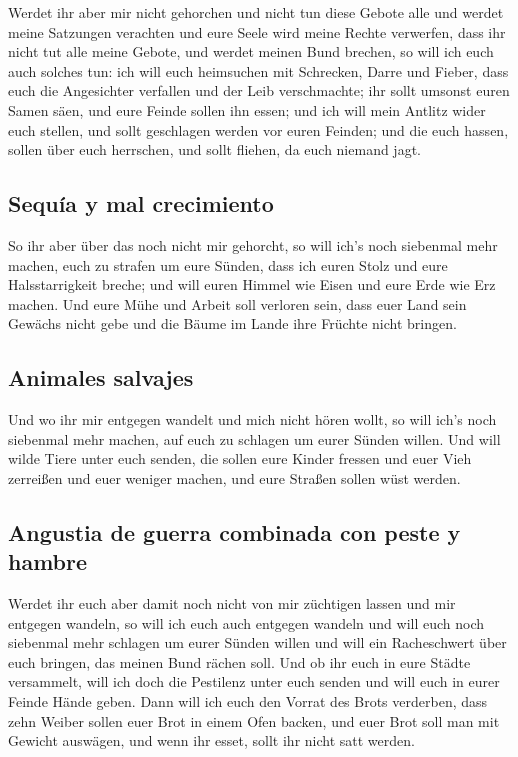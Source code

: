  Werdet ihr aber mir nicht gehorchen und nicht tun diese
Gebote alle  und werdet meine Satzungen verachten und
eure Seele wird meine Rechte verwerfen, dass ihr nicht tut alle meine
Gebote, und werdet meinen Bund brechen,  so will ich euch
auch solches tun: ich will euch heimsuchen mit Schrecken, Darre und
Fieber, dass euch die Angesichter verfallen und der Leib verschmachte;
ihr sollt umsonst euren Samen säen, und eure Feinde sollen ihn essen;
 und ich will mein Antlitz wider euch stellen, und sollt
geschlagen werden vor euren Feinden; und die euch hassen, sollen über
euch herrschen, und sollt fliehen, da euch niemand jagt.

\hypertarget{sequuxeda-y-mal-crecimiento}{%
\subsection{Sequía y mal
crecimiento}\label{sequuxeda-y-mal-crecimiento}}

 So ihr aber über das noch nicht mir gehorcht, so will
ich's noch siebenmal mehr machen, euch zu strafen um eure Sünden,
 dass ich euren Stolz und eure Halsstarrigkeit breche;
und will euren Himmel wie Eisen und eure Erde wie Erz machen.
 Und eure Mühe und Arbeit soll verloren sein, dass euer
Land sein Gewächs nicht gebe und die Bäume im Lande ihre Früchte nicht
bringen.

\hypertarget{animales-salvajes}{%
\subsection{Animales salvajes}\label{animales-salvajes}}

 Und wo ihr mir entgegen wandelt und mich nicht hören
wollt, so will ich's noch siebenmal mehr machen, auf euch zu schlagen um
eurer Sünden willen.  Und will wilde Tiere unter euch
senden, die sollen eure Kinder fressen und euer Vieh zerreißen und euer
weniger machen, und eure Straßen sollen wüst werden.

\hypertarget{angustia-de-guerra-combinada-con-peste-y-hambre}{%
\subsection{Angustia de guerra combinada con peste y
hambre}\label{angustia-de-guerra-combinada-con-peste-y-hambre}}

 Werdet ihr euch aber damit noch nicht von mir züchtigen
lassen und mir entgegen wandeln,  so will ich euch auch
entgegen wandeln und will euch noch siebenmal mehr schlagen um eurer
Sünden willen  und will ein Racheschwert über euch
bringen, das meinen Bund rächen soll. Und ob ihr euch in eure Städte
versammelt, will ich doch die Pestilenz unter euch senden und will euch
in eurer Feinde Hände geben.  Dann will ich euch den
Vorrat des Brots verderben, dass zehn Weiber sollen euer Brot in einem
Ofen backen, und euer Brot soll man mit Gewicht auswägen, und wenn ihr
esset, sollt ihr nicht satt werden.

